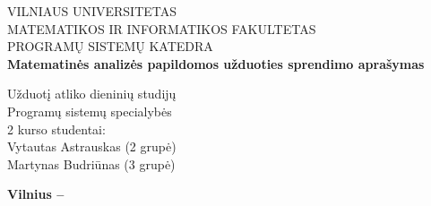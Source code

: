 \begin{titlepage}
  
  \begin{center}

    \uppercase{\Large Vilniaus universitetas\\
    Matematikos ir informatikos fakultetas\\
    Programų sistemų katedra}\\[7.0cm]

    \textbf{\LARGE 
    Matematinės analizės papildomos užduoties sprendimo aprašymas
    }\\[5.0cm]

    \begin{minipage}[]{0.8\textwidth}
      \begin{flushright}
    {\large 
    Užduotį atliko dieninių studijų\\
    Programų sistemų specialybės\\
    2 kurso studentai:\\
    Vytautas Astrauskas (2 grupė)\\
    Martynas Budriūnas (3 grupė)}
      \end{flushright}
    \end{minipage}

    \vfill

    \textbf{\large Vilnius – \the\year}

  \end{center}

\end{titlepage}

